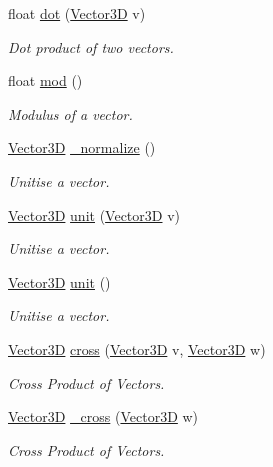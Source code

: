 \begin{DoxyCompactItemize}
float \hyperlink{classVector3D_a1ce3b44c173b466c98b555ac2e3526ff}{dot} (\hyperlink{classVector3D}{\-Vector3\-D} v)
\begin{DoxyCompactList}\small\item\em \-Dot product of two vectors. \end{DoxyCompactList}\item 
float \hyperlink{classVector3D_ae3a7282bc1f6eaf52e2f0e72090aefa0}{mod} ()
\begin{DoxyCompactList}\small\item\em \-Modulus of a vector. \end{DoxyCompactList}\item 
\hyperlink{classVector3D}{\-Vector3\-D} \hyperlink{classVector3D_a596cfedc186cb37da76968ca32a3416b}{\-\_\-normalize} ()
\begin{DoxyCompactList}\small\item\em \-Unitise a vector. \end{DoxyCompactList}\item 
\hyperlink{classVector3D}{\-Vector3\-D} \hyperlink{classVector3D_a488df8e5795747d30f90c7f0d53ea27c}{unit} (\hyperlink{classVector3D}{\-Vector3\-D} v)
\begin{DoxyCompactList}\small\item\em \-Unitise a vector. \end{DoxyCompactList}\item 
\hyperlink{classVector3D}{\-Vector3\-D} \hyperlink{classVector3D_ace41d61f9b58615ac6e9bdcb8656934e}{unit} ()
\begin{DoxyCompactList}\small\item\em \-Unitise a vector. \end{DoxyCompactList}\item 
\hyperlink{classVector3D}{\-Vector3\-D} \hyperlink{classVector3D_ac1e94fb608aff47985b125560a18ed97}{cross} (\hyperlink{classVector3D}{\-Vector3\-D} v, \hyperlink{classVector3D}{\-Vector3\-D} w)
\begin{DoxyCompactList}\small\item\em \-Cross \-Product of \-Vectors. \end{DoxyCompactList}\item 
\hyperlink{classVector3D}{\-Vector3\-D} \hyperlink{classVector3D_ab5cf5dd48d9bf834b697cc48760cac69}{\-\_\-cross} (\hyperlink{classVector3D}{\-Vector3\-D} w)
\begin{DoxyCompactList}\small\item\em \-Cross \-Product of \-Vectors. \end{DoxyCompactList}\item 

\end{DoxyCompactItemize}
